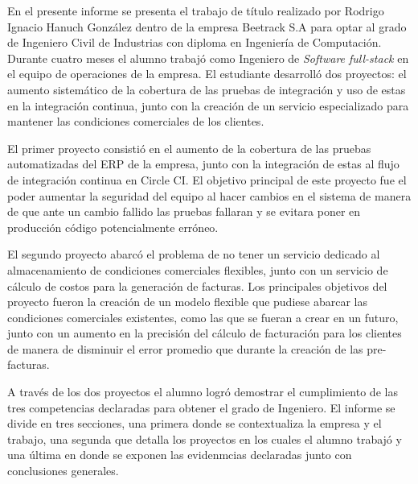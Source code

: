 En el presente informe se presenta el trabajo de título realizado por Rodrigo Ignacio Hanuch González dentro de la empresa Beetrack S.A para optar al grado de Ingeniero Civil de Industrias con diploma en Ingeniería de Computación. Durante cuatro meses el alumno trabajó como Ingeniero de \textit{Software full-stack} en el equipo de operaciones de la empresa. El estudiante desarrolló dos proyectos: el aumento sistemático de la cobertura de las pruebas de integración y uso de estas en la integración continua, junto con la creación de un servicio especializado para mantener las condiciones comerciales de los clientes.

El primer proyecto consistió en el aumento de la cobertura de las pruebas automatizadas del ERP de la empresa, junto con la integración de estas al flujo de integración continua en Circle CI. El objetivo principal de este proyecto fue el poder aumentar la seguridad del equipo al hacer cambios en el sistema de manera de que ante un cambio fallido las pruebas fallaran y se evitara poner en producción código potencialmente erróneo.

El segundo proyecto abarcó el problema de no tener un servicio dedicado al almacenamiento de condiciones comerciales flexibles, junto con un servicio de cálculo de costos para la generación de facturas. Los principales objetivos del proyecto fueron la creación de un modelo flexible que pudiese abarcar las condiciones comerciales existentes, como las que se fueran a crear en un futuro, junto con un aumento en la precisión del cálculo de facturación para los clientes de manera de disminuir el error promedio que durante la creación de las pre-facturas.

A través de los dos proyectos el alumno logró demostrar el cumplimiento de las tres competencias declaradas para obtener el grado de Ingeniero. El informe se divide en tres secciones, una primera donde se contextualiza la empresa y el trabajo, una segunda que detalla los proyectos en los cuales el alumno trabajó y una última en donde se exponen las evidenmcias declaradas junto con conclusiones generales.

